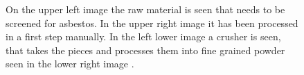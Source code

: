 \begin{figure}[h]
\centering

\caption{On the upper left image the raw material is seen that needs to be screened for asbestos. In the upper right image it has been processed in a first step manually. In the left lower image a crusher is seen, that takes the pieces and processes them into fine grained powder seen in the lower right image \cite{mohammed2015}. }
\label{fig:sampleprep}
\end{figure}


